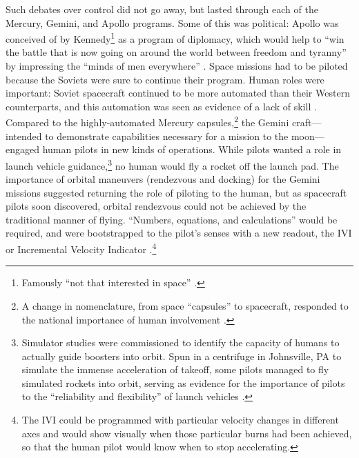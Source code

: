 Such debates over control did not go away, but lasted through each
of the Mercury, Gemini, and Apollo programs. Some of this was
political: Apollo was
conceived of by Kennedy\footnote{Famously ``not that interested in
space'' \cite{KennedyNov21}.} as a program of diplomacy,
which would help to ``win the battle that is now going on around the
world between freedom and tyranny'' by impressing the ``minds of men
everywhere'' \cite{KennedyMay25}. Space missions had to be piloted
because the Soviets were sure to continue their program. Human
roles were important: Soviet spacecraft continued to be
more automated than their Western counterparts, and
this automation was seen as evidence of a lack of skill \cite[p.
  90]{DM}.
Compared to the highly-automated Mercury capsules,\footnote{A change in nomenclature,
  from space ``capsules'' to spacecraft, responded to the national
  importance of human involvement \cite[p. 85]{kauffman}.} the Gemini
craft---intended to demonstrate capabilities necessary 
for a mission to the moon---engaged human pilots in new kinds of
operations. While pilots wanted a role in launch vehicle
guidance,\footnote{Simulator studies were commissioned to identify the
  capacity of humans to 
actually guide boosters into orbit. Spun in a
centrifuge in Johnsville, PA to simulate the immense acceleration of
takeoff, some pilots managed to fly
simulated rockets into orbit, serving as evidence for the importance of
pilots to the ``reliability and flexibility'' of launch vehicles
\cite[p. 72]{DM}.} no 
human would fly a rocket off the launch pad. The importance of orbital maneuvers
 (rendezvous and docking) for the Gemini missions suggested returning
the role of piloting to the human, but as spacecraft
pilots soon discovered, orbital
rendezvous could not be achieved by the
traditional manner of flying.
``Numbers, equations, and calculations'' would be  
required, and were bootstrapped to the pilot's senses with a new
readout, the IVI or Incremental Velocity Indicator \cite[p.
  86-87]{DM}.\footnote{The IVI could be
programmed with particular velocity changes in different axes and
would show visually when those particular burns had been achieved,
so that the human pilot would know when to stop accelerating.}




